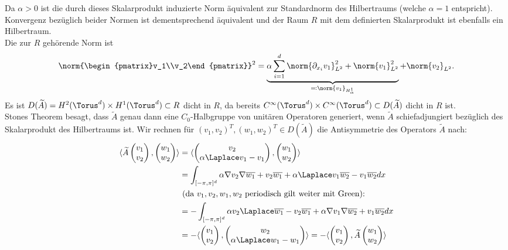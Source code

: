 Da $\alpha>0$ ist die durch dieses Skalarprodukt induzierte Norm äquivalent zur Standardnorm des Hilbertraums (welche $\alpha=1$ entspricht). Konvergenz bezüglich beider Normen ist dementsprechend äquivalent und der Raum $R$ mit dem definierten Skalarprodukt ist ebenfalls ein Hilbertraum.\\
Die zur $R$ gehörende Norm ist
\[\norm{\begin{pmatrix}v_1\\v_2\end{pmatrix}}^2=\underbrace{\alpha \sum_{i=1}^d\norm{\partial_{x_i} v_1}^2_{L^2}+\norm{v_1}_{L^2}^2}_{\eqqcolon\norm{v_1}_{H^1_\alpha}}+\norm{v_2}_{L^2}.\]
Es ist $D(\widetilde{A})=H^2(\Torus^d)\times H^1(\Torus^d)\subset R$ dicht in $R$, da bereits $C^\infty(\Torus^d)\times C^\infty(\Torus^d)\subset D(\widetilde{A})$ dicht in $R$ ist.\\
Stones Theorem besagt, dass $\widetilde{A}$ genau dann eine $C_0$-Halbgruppe von unitären Operatoren generiert, wenn $\widetilde{A}$ schiefadjungiert bezüglich des Skalarprodukt des Hilbertraums ist. Wir rechnen für $(v_1,v_2)^T, (w_1,w_2)^T\in D(\widetilde{A})$ die Antisymmetrie des Operators $\widetilde{A}$ nach:
\begin{align*}
\langle \widetilde{A}\begin{pmatrix}v_1\\v_2\end{pmatrix}, \begin{pmatrix}w_1\\w_2\end{pmatrix}\rangle
&=\langle \begin{pmatrix} v_2\\\alpha \Laplace v_1-v_1\end{pmatrix}, \begin{pmatrix}w_1\\w_2\end{pmatrix}\rangle\\
&=\int_{[-\pi,\pi]^d} \alpha \nabla v_2\nabla \overline{w_1} +v_2\overline{w_1}+ \alpha \Laplace v_1 \overline{w_2} - v_1\overline{w_2}dx\\
&\text{ (da $v_1,v_2,w_1,w_2$ periodisch gilt weiter mit Green):}\\
&=-\int_{[-\pi,\pi]^d}\alpha v_2\Laplace \overline{w_1}-v_2\overline{w_1}+ \alpha \nabla v_1\nabla \overline{w_2} + v_1\overline{w_2}dx\\
&=-\langle \begin{pmatrix} v_1\\ v_2\end{pmatrix}, \begin{pmatrix} w_2\\\alpha \Laplace w_1-w_1\end{pmatrix}\rangle=-\langle \begin{pmatrix}v_1\\v_2\end{pmatrix}, \widetilde{A}\begin{pmatrix}w_1\\w_2\end{pmatrix}\rangle
\end{align*}
